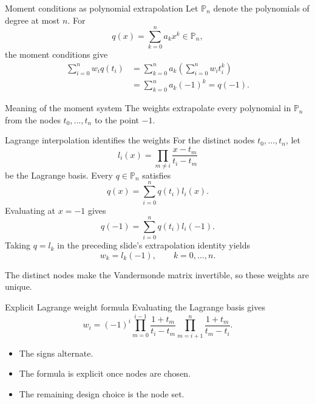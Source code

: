 \documentclass[aspectratio=169,11pt]{beamer}
\begin{document}
\begin{frame}{Moment conditions as polynomial extrapolation}
\small
Let $\mathbb{P}_n$ denote the polynomials of degree at most $n$.
For
\[
  q(x)=\sum_{k=0}^n a_kx^k\in\mathbb{P}_n,
\]
the moment conditions give
\[
  \begin{aligned}
    \sum_{i=0}^n w_iq(t_i)
    &=
    \sum_{k=0}^n a_k\left(\sum_{i=0}^n w_it_i^k\right) \\
    &=
    \sum_{k=0}^n a_k(-1)^k
    =q(-1).
  \end{aligned}
\]

\begin{block}{Meaning of the moment system}
The weights extrapolate every polynomial in $\mathbb{P}_n$ from the nodes
$t_0,\ldots,t_n$ to the point $-1$.
\end{block}
\end{frame}

\begin{frame}{Lagrange interpolation identifies the weights}
\small
For the distinct nodes $t_0,\ldots,t_n$, let
\[
  l_i(x)=
  \prod_{m\ne i}\frac{x-t_m}{t_i-t_m}
\]
be the Lagrange basis. Every $q\in\mathbb{P}_n$ satisfies
\[
  q(x)=\sum_{i=0}^n q(t_i)l_i(x).
\]
Evaluating at $x=-1$ gives
\[
  q(-1)=\sum_{i=0}^n q(t_i)l_i(-1).
\]
Taking $q=l_k$ in the preceding slide's extrapolation identity yields
\[
  \boxed{w_k=l_k(-1),\qquad k=0,\ldots,n.}
\]

\vspace{1mm}
The distinct nodes make the Vandermonde matrix invertible, so these weights are unique.
\end{frame}

\begin{frame}{Explicit Lagrange weight formula}
\small
Evaluating the Lagrange basis gives
\[
  w_i=(-1)^i
  \prod_{m=0}^{i-1}\frac{1+t_m}{t_i-t_m}
  \prod_{m=i+1}^{n}\frac{1+t_m}{t_m-t_i}.
\]

\begin{itemize}
  \item The signs alternate.
  \item The formula is explicit once nodes are chosen.
  \item The remaining design choice is the node set.
\end{itemize}
\end{frame}
\end{document}
